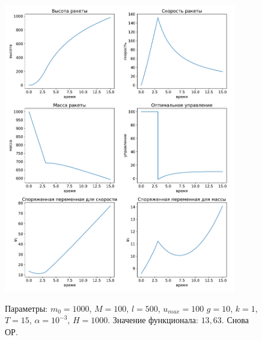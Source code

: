 \documentclass[12pt, a4paper]{article} %
\begin{document}
\begin{figure}[H]
\begin{center}
    \includegraphics[width=0.9\textwidth]{2_3.pdf}
    \label{fig:1_5}
    \caption{Параметры: $m_0=1000$, $M=100$,  $l=500$,  $u_{max}=100$
        $g=10$,  $k=1$,  $T=15$, $\alpha=10^{-3}$,  $H=1000$.
        Значение функционала: $13{,}63$.
        Снова ОР.}
\end{center} 
\end{figure}




 
\end{document}

